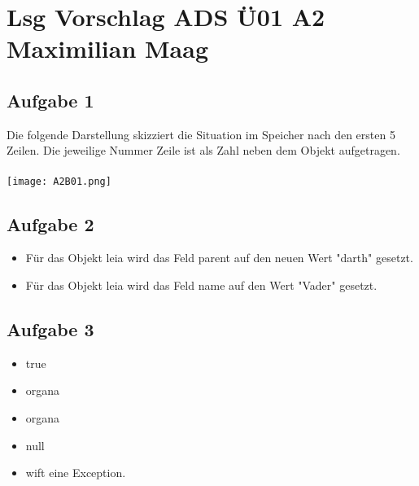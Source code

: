 \documentclass{article}
\begin{document}
	\section*{Lsg Vorschlag ADS Ü01 A2 Maximilian Maag}
	\subsection*{Aufgabe 1}
	Die folgende Darstellung skizziert die Situation im Speicher nach den ersten 5 Zeilen. Die jeweilige Nummer Zeile ist als Zahl neben dem Objekt aufgetragen. \\ \\
	\texttt{[image: A2B01.png]}
	\subsection*{Aufgabe 2}
	\begin{itemize}
		\item Für das Objekt leia wird das Feld parent auf den neuen Wert "darth" gesetzt.
		\item Für das Objekt leia wird das Feld name auf den Wert "Vader" gesetzt.
	\end{itemize}
	\subsection*{Aufgabe 3}
	\begin{itemize}
		\item true
		\item organa
		\item organa
		\item null
		\item wift eine Exception.
	\end{itemize}
\end{document}
